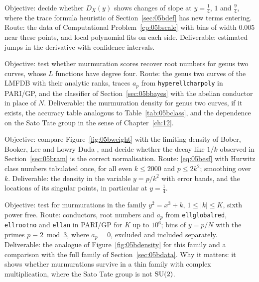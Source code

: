 \begin{compproblem}[Kinks at $y=t^2/4$]
Objective: decide whether $D_X(y)$ shows changes of slope at $y=\frac14$, $1$ and $\frac94$, where the trace formula heuristic of Section~\ref{sec:05bdef} has new terms entering. Route: the data of Computational Problem~\ref{cp:05bscale} with bins of width $0.005$ near these points, and local polynomial fits on each side. Deliverable: estimated jumps in the derivative with confidence intervals.
\end{compproblem}

\begin{compproblem}
Objective: test whether murmuration scores recover root numbers for genus two curves, whose $L$ functions have degree four. Route: the genus two curves of the LMFDB \cite{lmfdb} with their analytic ranks, traces $a_p$ from \texttt{hyperellcharpoly} in PARI/GP, and the classifier of Section~\ref{sec:05bbayes} with the abelian conductor in place of $N$. Deliverable: the murmuration density for genus two curves, if it exists, the accuracy table analogous to Table~\ref{tab:05bclass}, and the dependence on the Sato Tate group in the sense of Chapter~\ref{ch:12}.
\end{compproblem}

\begin{compproblem}\label{cp:05bweight}
Objective: compare Figure~\ref{fig:05bweight} with the limiting density of Bober, Booker, Lee and Lowry Duda \cite{bbllp2023}, and decide whether the decay like $1/k$ observed in Section~\ref{sec:05bram} is the correct normalisation. Route: \eqref{eq:05besf} with Hurwitz class numbers tabulated once, for all even $k\le2000$ and $p\le2k^2$; smoothing over $k$. Deliverable: the density in the variable $y=p/k^2$ with error bands, and the locations of its singular points, in particular at $y=\frac14$.
\end{compproblem}

\begin{compproblem}\label{cp:05bmordell}
Objective: test for murmurations in the family $y^2=x^3+k$, $1\le|k|\le K$, sixth power free. Route: conductors, root numbers and $a_p$ from \texttt{ellglobalred}, \texttt{ellrootno} and \texttt{ellan} in PARI/GP for $K$ up to $10^6$; bins of $y=p/N$ with the primes $p\equiv2\bmod3$, where $a_p=0$, excluded and included separately. Deliverable: the analogue of Figure~\ref{fig:05bdensity} for this family and a comparison with the full family of Section~\ref{sec:05bdata}. Why it matters: it shows whether murmurations survive in a thin family with complex multiplication, where the Sato Tate group is not $\mathrm{SU}(2)$.
\end{compproblem}
